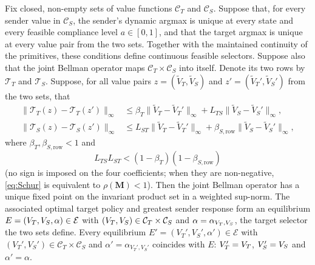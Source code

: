 \begin{theorem}
\label{thm:existence}
Fix closed, non-empty sets of value functions $\mathcal C_T$ and
$\mathcal C_S$. Suppose that, for every sender value in $\mathcal C_S$, the
sender's dynamic argmax is unique at every state and every feasible compliance
level $a\in[0,1]$, and that the target argmax is unique at every value pair from the two sets.
Together with the maintained continuity of the primitives, these
conditions define continuous feasible selectors. Suppose also that the
joint Bellman operator maps
$\mathcal C_T\times\mathcal C_S$ into itself. Denote its two rows by
$\mathcal T_T$ and $\mathcal T_S$. Suppose, for all value pairs
$z=(\tilde V_T,\tilde V_S)$ and $z'=(\tilde V_T',\tilde V_S')$ from the two sets, that
\begin{align}
\|\mathcal T_T(z)-\mathcal T_T(z')\|_\infty
&\leq
\beta_T\|\tilde V_T-\tilde V_T'\|_\infty+L_{TS}\|\tilde V_S-\tilde V_S'\|_\infty,\\
\|\mathcal T_S(z)-\mathcal T_S(z')\|_\infty
&\leq
L_{ST}\|\tilde V_T-\tilde V_T'\|_\infty+
\beta_{S,\mathrm{row}}\|\tilde V_S-\tilde V_S'\|_\infty,
\end{align}
where $\beta_T,\beta_{S,\mathrm{row}}<1$ and
\begin{equation}
\boxed{
L_{TS}L_{ST}
<
(1-\beta_T)(1-\beta_{S,\mathrm{row}})
}
\label{eq:Schur}
\end{equation}
(no sign is imposed on the four coefficients; when they are non-negative,
\eqref{eq:Schur} is equivalent to $\rho(\mathbf M)<1$). Then the joint
Bellman operator has a unique fixed point on the invariant product set in a weighted
sup-norm. The associated optimal target policy and greatest sender response
form an equilibrium $E=(V_T,V_S,\alpha)\in\mathcal E$ with
$(V_T,V_S)\in\mathcal C_T\times\mathcal C_S$ and $\alpha=\alpha_{V_T,V_S}$,
the target selector the two sets define. Every equilibrium
$E'=(V_T',V_S',\alpha')\in\mathcal E$ with
$(V_T',V_S')\in\mathcal C_T\times\mathcal C_S$ and
$\alpha'=\alpha_{V_T',V_S'}$ coincides with $E$: $V_T'=V_T$, $V_S'=V_S$ and
$\alpha'=\alpha$.
\end{theorem}

